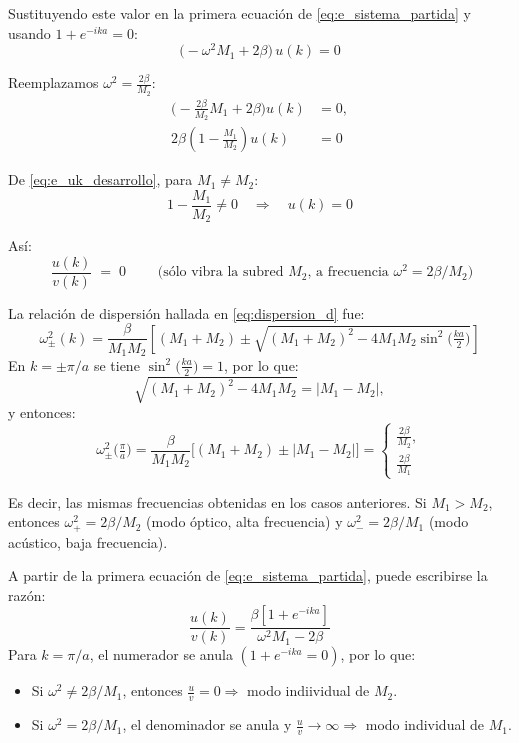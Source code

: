 \documentclass{article}
\begin{document}
Sustituyendo este valor en la primera ecuación de \eqref{eq:e_sistema_partida} y usando \(1+e^{-ika}=0\):
\begin{equation}
\big(-\omega^{2}M_{1}+2\beta\big)\,u(k) = 0
\label{eq:e_uk_reducida}
\end{equation}

Reemplazamos \(\omega^{2}=\frac{2\beta}{M_{2}}\):
\begin{equation}
\begin{split}
\Big(-\frac{2\beta}{M_{2}}M_{1}+2\beta\Big)u(k) &= 0,\\[4pt]
2\beta\left(1-\frac{M_{1}}{M_{2}}\right)u(k) &= 0
\end{split}
\label{eq:e_uk_desarrollo}
\end{equation}

De \eqref{eq:e_uk_desarrollo}, para \(M_{1}\neq M_{2}\):
\[
1-\frac{M_{1}}{M_{2}}\neq 0 \quad\Rightarrow\quad u(k)=0
\]

Así:
\begin{equation}
\boxed{\;\dfrac{u(k)}{v(k)}\;=\;0\;}
\qquad\text{(sólo vibra la subred \(M_{2}\), a frecuencia \(\omega^{2}=2\beta/M_{2}\))}
\label{eq:e_razon_cero}
\end{equation}

La relación de dispersión hallada en \eqref{eq:dispersion_d} fue:
\[
\omega^{2}_{\pm}(k)=\frac{\beta}{M_{1}M_{2}}
\left[(M_{1}+M_{2})\pm\sqrt{(M_{1}+M_{2})^{2}-4M_{1}M_{2}\sin^{2}\!\Big(\tfrac{ka}{2}\Big)}\right]
\]
En \(k=\pm\pi/a\) se tiene \(\sin^{2}\!\big(\tfrac{ka}{2}\big)=1\), por lo que:
\[
\sqrt{(M_{1}+M_{2})^{2}-4M_{1}M_{2}}=\lvert M_{1}-M_{2}\rvert,
\]
y entonces:
\begin{equation}
\omega^{2}_{\pm}\Big(\tfrac{\pi}{a}\Big)=\frac{\beta}{M_{1}M_{2}}
\Big[(M_{1}+M_{2})\pm\lvert M_{1}-M_{2}\rvert\Big]
=\begin{cases}
\displaystyle \frac{2\beta}{M_{2}},\\[6pt]
\displaystyle \frac{2\beta}{M_{1}}
\end{cases}
\label{eq:e_match_dispersion}
\end{equation}

Es decir, las mismas frecuencias obtenidas en los casos anteriores.  
Si \(M_{1}>M_{2}\), entonces \(\omega^{2}_{+}=2\beta/M_{2}\) (modo óptico, alta frecuencia)
y \(\omega^{2}_{-}=2\beta/M_{1}\) (modo acústico, baja frecuencia).

A partir de la primera ecuación de \eqref{eq:e_sistema_partida}, puede escribirse la razón:
\[
\frac{u(k)}{v(k)}=\frac{\beta[1+e^{-ika}]}{\omega^{2}M_{1}-2\beta}
\]
Para \(k=\pi/a\), el numerador se anula \((1+e^{-ika}=0)\), por lo que:
\begin{itemize}
  \item[$\bullet$] Si \(\omega^{2}\neq 2\beta/M_{1}\), entonces \(\frac{u}{v}=0\Rightarrow\) modo indiividual de \(M_{2}\).
  \item[$\bullet$] Si \(\omega^{2}=2\beta/M_{1}\), el denominador se anula y \(\frac{u}{v}\to\infty\Rightarrow\) modo individual de \(M_{1}\).
\end{itemize}
\end{document}
